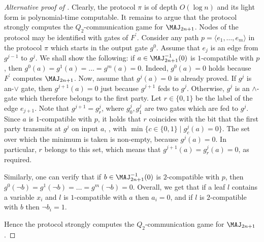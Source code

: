 \begin{proof}[Alternative proof of ]
Clearly, the protocol $\pi$ is of depth $O(\log n)$ and its light form is polynomial-time computable.  It remains to argue that the protocol strongly computes the $Q_2$-communication game for $\MAJ_{2n + 1}$. Nodes of the protocol may be identified with gates of $F^\prime$. Consider any path $p = \langle e_1, \ldots, e_m \rangle$ in the protocol $\pi$ which starts in the output gate $g^0$. Assume that $e_j$ is an edge from $g^{j - 1}$ to $g^j$. We shall show the following: if $a\in\MAJ_{2n + 1}^{-1}(0)$ is $1$-compatible with $p$, then $g^0(a) = g^1(a) = \ldots = g^m(a) = 0$. Indeed, $g^0(a) = 0$ holds because $F^\prime$ computes $\MAJ_{2n + 1}$. Now, assume that $g^j(a) = 0$ is already proved. If $g^j$ is an-$\lor$ gate, then $g^{j + 1}(a) = 0$ just because $g^{j + 1}$ feds to $g^j$. Otherwise, $g^j$ is an $\land$-gate which therefore belongs to the first party. Let $r\in\{0, 1\}$ be the label of the edge $e_{j + 1}$. Note that $g^{j + 1}  = g^j_r$, where $g^j_0, g^j_1$ are two gates which are fed to $g^j$. Since $a$ is $1$-compatible with $p$, it holds that $r$ coincides with the bit that the first party transmits at $g^j$ on input $a$, \ie, with $\min\{c \in\{0, 1\} \mid g^j_c(a) = 0\}$. The set over which the minimum is taken is non-empty, because $g^j(a) = 0$. In particular, $r$ belongs to this set, which means that $g^{j + 1}(a) = g^j_r(a) = 0$, as required.

Similarly, one can verify that if $b\in\MAJ_{2n + 1}^{-1}(0)$ is $2$-compatible with $p$, then $g^0(\lnot b) = g^1(\lnot b) = \ldots = g^m(\lnot b) = 0$. Overall, we get that if a leaf $l$
%
%
%
%
%
contains a variable $x_i$ and $l$ is $1$-compatible with $a$
then $a_i=0$, and if $l$ is $2$-compatible with $b$ then
$\lnot b_i = 1$.  %

Hence the protocol strongly computes the $Q_2$-communication game 
for $\MAJ_{2n + 1}$.
\end{proof} 

